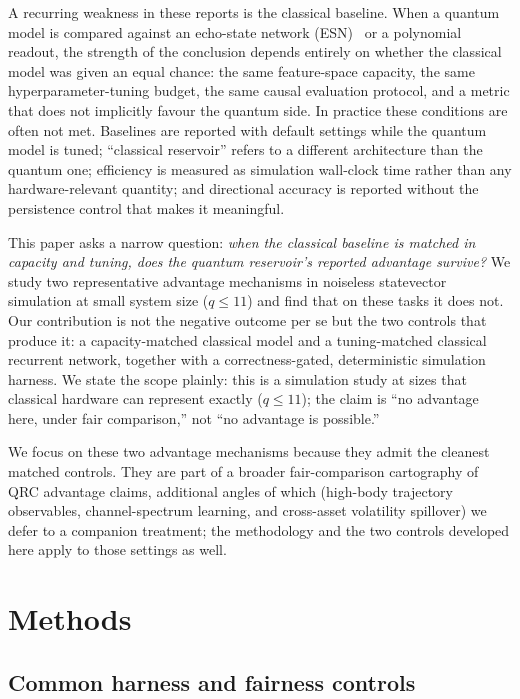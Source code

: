 \documentclass[11pt,a4paper]{article}
\begin{document}
A recurring weakness in these reports is the classical baseline. When a quantum
model is compared against an echo-state network (ESN)~\cite{jaeger2001} or a
polynomial readout,
the strength of the conclusion depends entirely on whether the classical model
was given an equal chance: the same feature-space capacity, the same
hyperparameter-tuning budget, the same causal evaluation protocol, and a metric
that does not implicitly favour the quantum side. In practice these conditions
are often not met. Baselines are reported with default settings while the
quantum model is tuned; ``classical reservoir'' refers to a different
architecture than the quantum one; efficiency is measured as simulation
wall-clock time rather than any hardware-relevant quantity; and directional
accuracy is reported without the persistence control that makes it meaningful.

This paper asks a narrow question: \emph{when the classical
baseline is matched in capacity and tuning, does the quantum reservoir's
reported advantage survive?} We study two representative advantage mechanisms in
noiseless statevector simulation at small system size ($q\le 11$) and find that
on these tasks it does not. Our contribution is not the negative
outcome per se but the two controls that produce it: a capacity-matched
classical model and a tuning-matched classical recurrent network, together with
a correctness-gated, deterministic simulation harness. We state the scope
plainly: this is a simulation study at sizes that classical hardware can
represent exactly ($q \le 11$); the claim is ``no advantage here, under fair
comparison,'' not ``no advantage is possible.''

We focus on these two advantage mechanisms because they admit the cleanest
matched controls. They are part of a broader fair-comparison cartography of QRC
advantage claims, additional angles of which (high-body trajectory observables,
channel-spectrum learning, and cross-asset volatility spillover) we defer to a
companion treatment; the methodology and the two controls developed here apply
to those settings as well.

\section{Methods}
\label{sec:methods}

\subsection{Common harness and fairness controls}
\end{document}
